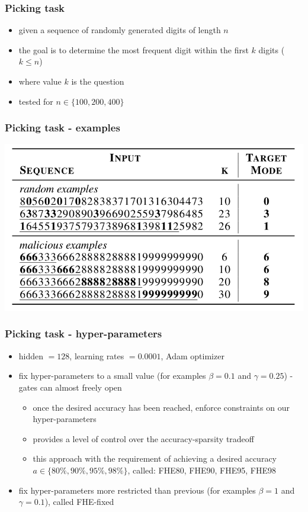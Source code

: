 \documentclass{beamer}
\begin{document}
\begin{frame}
    \frametitle{Picking task}
    \begin{itemize}
        \item given a sequence of randomly generated digits of length $n$
        \item the goal is to determine the most frequent digit within the first $k$ digits ($k \le n$)
        \item where value $k$ is the question
        \item tested for $n \in \{100, 200, 400\}$
    \end{itemize}
\end{frame}

\begin{frame}
    \frametitle{Picking task - examples}
    \begin{center}
        \includegraphics[scale=1.5]{img/picking-table1.png}
    \end{center}
\end{frame}

\begin{frame}
    \frametitle{Picking task - hyper-parameters}
    \begin{itemize}
        \item hidden $= 128$, learning rates $=  0.0001$, Adam optimizer
        \item fix hyper-parameters to a small value (for examples $\beta = 0.1$ and $\gamma = 0.25$) - gates can almost freely open
        \begin{itemize}
            \item once the desired accuracy has been reached, enforce constraints on our hyper-parameters
            \item provides a level of control over the accuracy-sparsity tradeoff
            \item this approach with the requirement of achieving a desired accuracy $a \in \{80\%, 90\%, 95\%, 98\%\}$, called: FHE80, FHE90, FHE95, FHE98
        \end{itemize}
        \item fix hyper-parameters more restricted than previous (for examples $\beta = 1$ and $\gamma = 0.1$), called FHE-fixed
    \end{itemize}
\end{frame}
\end{document}

